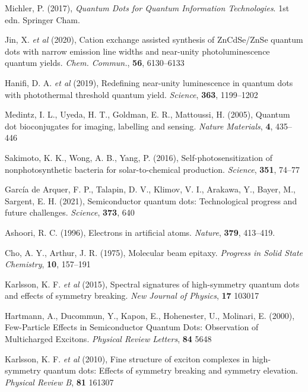 \documentclass[12pt]{article}
\begin{document}
\begin{thebibliography}{10}

Michler, P. (2017), \textit{Quantum Dots for Quantum Information Technologies}. 1st edn. Springer Cham.

Jin, X. \textit{et al} (2020), Cation exchange assisted synthesis of ZnCdSe/ZnSe quantum dots with narrow emission line widths and near-unity photoluminescence quantum yields. \textit{Chem. Commun.}, \textbf{56}, 6130--6133

Hanifi, D. A. \textit{et al} (2019), Redefining near-unity luminescence in quantum dots with photothermal threshold quantum yield. \textit{Science}, \textbf{363}, 1199--1202

Medintz, I. L., Uyeda, H. T., Goldman, E. R., Mattoussi, H. (2005),
Quantum dot bioconjugates for imaging, labelling and sensing. \textit{Nature Materials}, \textbf{4}, 435--446

Sakimoto, K. K., Wong, A. B., Yang, P. (2016), Self-photosensitization
of nonphotosynthetic bacteria for solar-to-chemical production. \textit{Science}, \textbf{351}, 74--77

García de Arquer, F. P., Talapin, D. V., Klimov, V. I., Arakawa, Y., Bayer, M., Sargent, E. H. (2021), Semiconductor quantum dots: Technological progress and future challenges. \textit{Science}, \textbf{373}, 640 

Ashoori, R. C. (1996), Electrons in artificial atoms. \textit{Nature}, \textbf{379}, 413--419.

Cho, A. Y., Arthur, J. R. (1975), Molecular beam epitaxy. \textit{Progress in Solid State Chemistry}, \textbf{10}, 157--191

Karlsson, K. F. \textit{et al} (2015), Spectral signatures of high-symmetry quantum dots and effects of symmetry breaking. \textit{New Journal of Physics}, \textbf{17} 103017

Hartmann, A., Ducommun, Y., Kapon, E., Hohenester, U., Molinari, E. (2000), Few-Particle Effects in Semiconductor Quantum Dots: Observation of Multicharged Excitons. \textit{Physical Review Letters}, \textbf{84} 5648

Karlsson, K. F. \textit{et al} (2010), Fine structure of exciton complexes in high-symmetry quantum dots: Effects of symmetry breaking and symmetry elevation. \textit{Physical Review B}, \textbf{81} 161307


\end{thebibliography}
\end{document}
